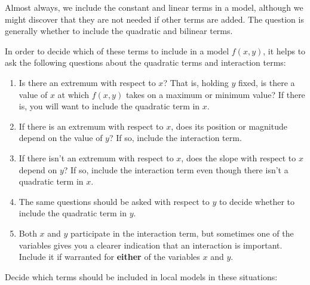 Almost always, we include the constant and linear terms in a model,
although we might discover that they are not needed if other terms are
added.  The question is generally whether to include the quadratic and
bilinear terms.  

In order to decide which of these terms to include in a model
$f(x,y)$, it helps to ask the following questions about the quadratic terms and interaction terms:

\begin{enumerate}

\item Is there an extremum with respect to $x$?  That is, holding $y$
  fixed, is there a value of $x$ at which $f(x,y)$ takes on a maximum
  or minimum value?  If there is, you will want to include the
  quadratic term in $x$.


\item If there is an extremum with respect to $x$, does its position
  or magnitude depend on the value of $y$?  If so, include the
  interaction term.

\item If there isn't an extremum with respect to $x$, does the slope
  with respect to $x$ depend on $y$? If so, include the interaction term even though there isn't a quadratic term in $x$.

\item The same questions should be asked with respect to $y$ to decide whether to include the quadratic term in $y$.   

\item Both $x$ and $y$ participate in the interaction term, but sometimes one of the variables gives you a clearer indication that an interaction is important.  Include it if warranted for {\bf either} of the variables $x$ and $y$.





\end{enumerate}


Decide which terms should be included in local models in these
situations:

